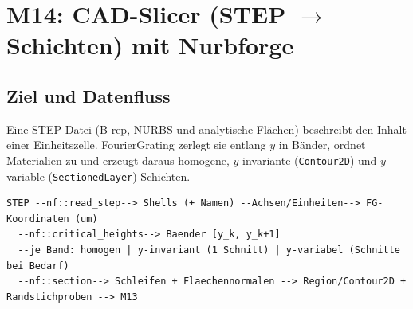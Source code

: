 \section{M14: CAD-Slicer (STEP $\to$ Schichten) mit Nurbforge}\label{sec:cad}

\subsection{Ziel und Datenfluss}
Eine STEP-Datei (B-rep, NURBS und analytische Flächen) beschreibt den Inhalt einer Einheitszelle. FourierGrating
zerlegt sie entlang $y$ in Bänder, ordnet Materialien zu und erzeugt daraus homogene, $y$-invariante
(\verb|Contour2D|) und $y$-variable (\verb|SectionedLayer|) Schichten.
{\footnotesize\begin{verbatim}
STEP --nf::read_step--> Shells (+ Namen) --Achsen/Einheiten--> FG-Koordinaten (um)
  --nf::critical_heights--> Baender [y_k, y_k+1]
  --je Band: homogen | y-invariant (1 Schnitt) | y-variabel (Schnitte bei Bedarf)
  --nf::section--> Schleifen + Flaechennormalen --> Region/Contour2D + Randstichproben --> M13
\end{verbatim}}

